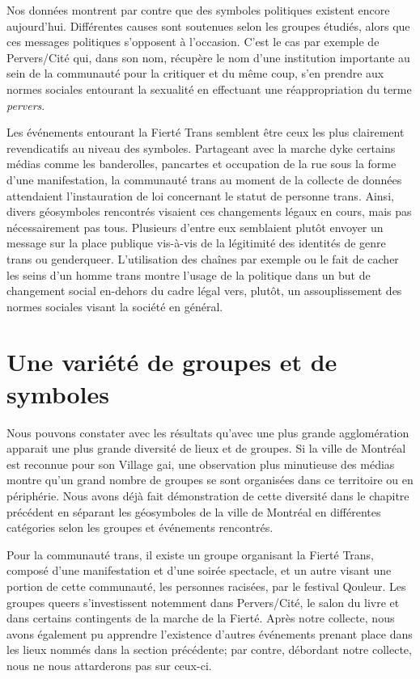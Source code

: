 Nos données montrent par contre que des symboles politiques existent encore aujourd'hui.
Différentes causes sont soutenues selon les groupes étudiés, alors que ces messages politiques s'opposent à l'occasion.
C'est le cas par exemple de Pervers/Cité qui, dans son nom, récupère le nom d'une institution importante au sein de la communauté \lgbt{} pour la critiquer et du même coup, s'en prendre aux normes sociales entourant la sexualité en effectuant une réappropriation du terme \emph{pervers}. 

Les événements entourant la Fierté Trans semblent être ceux les plus clairement revendicatifs au niveau des symboles.
Partageant avec la marche dyke certains médias comme les banderolles, pancartes et occupation de la rue sous la forme d'une manifestation, la communauté trans au moment de la collecte de données attendaient l'instauration de loi concernant le statut de personne trans.
Ainsi, divers géosymboles rencontrés visaient ces changements légaux en cours, mais pas nécessairement pas tous.
Plusieurs d'entre eux semblaient plutôt envoyer un message sur la place publique vis-à-vis de la légitimité des identités de genre trans ou genderqueer.
L'utilisation des chaînes par exemple ou le fait de cacher les seins d'un homme trans montre l'usage de la politique dans un but de changement social en-dehors du cadre légal vers, plutôt, un assouplissement des normes sociales visant la société en général.

\section{Une variété de groupes et de symboles}
\label{sec:une_variete_de_groupes_et_de_symboles}
Nous pouvons constater avec les résultats qu'avec une plus grande agglomération apparait une plus grande diversité de lieux et de groupes.
Si la ville de Montréal est reconnue pour son Village gai, une observation plus minutieuse des médias \lgbt montre qu'un grand nombre de groupes se sont organisées dans ce territoire ou en périphérie.
Nous avons déjà fait démonstration de cette diversité dans le chapitre précédent en séparant les géosymboles de la ville de Montréal en différentes catégories selon les groupes et événements rencontrés.

Pour la communauté trans, il existe un groupe organisant la Fierté Trans, composé d'une manifestation et d'une soirée spectacle, et un autre visant une portion de cette communauté, les personnes racisées, par le festival Qouleur.
Les groupes queers s'investissent notemment dans Pervers/Cité, le salon du livre  et dans certains contingents de la marche de la Fierté. 
Après notre collecte, nous avons également pu apprendre l'existence d'autres événements prenant place dans les lieux nommés dans la section précédente; par contre, débordant notre collecte, nous ne nous attarderons pas sur ceux-ci.

